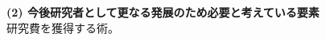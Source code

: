 \documentclass[11pt,a4j,dvipdfmx]{jarticle} 					%
\newcommand{\研究課題名}{ミューオン電子転換探索の感度向上に向けた解析手法の開発}
\newcommand{\研究機関名}{大阪大学}
\newcommand{\研究代表者氏名}{高見 翔太   }
\begin{document}

\vspace{5mm}
\noindent
\textbf{(2) 今後研究者として更なる発展のため必要と考えている要素}\\
研究費を獲得する術。



\end{document}

